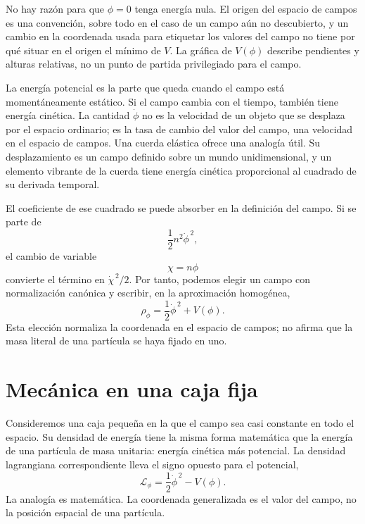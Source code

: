No hay razón para que \(\phi=0\) tenga energía nula. El origen del espacio de campos es una convención, sobre todo en el caso de un campo aún no descubierto, y un cambio en la coordenada usada para etiquetar los valores del campo no tiene por qué situar en el origen el mínimo de \(V\). La gráfica de \(V(\phi)\) describe pendientes y alturas relativas, no un punto de partida privilegiado para el campo.

La energía potencial es la parte que queda cuando el campo está momentáneamente estático. Si el campo cambia con el tiempo, también tiene energía cinética. La cantidad \(\dot\phi\) no es la velocidad de un objeto que se desplaza por el espacio ordinario; es la tasa de cambio del valor del campo, una velocidad en el espacio de campos. Una cuerda elástica ofrece una analogía útil. Su desplazamiento es un campo definido sobre un mundo unidimensional, y un elemento vibrante de la cuerda tiene energía cinética proporcional al cuadrado de su derivada temporal.

El coeficiente de ese cuadrado se puede absorber en la definición del campo. Si se parte de
\begin{equation}
\frac12 n^2\dot\phi^{\,2},
\end{equation}
el cambio de variable
\begin{equation}
\chi=n\phi
\end{equation}
convierte el término en \(\dot\chi^{\,2}/2\). Por tanto, podemos elegir un campo con normalización canónica y escribir, en la aproximación homogénea,
\begin{equation}
\rho_\phi=\frac12\dot\phi^{\,2}+V(\phi).
\label{eq:c09-rho-homogeneous}
\end{equation}
Esta elección normaliza la coordenada en el espacio de campos; no afirma que la masa literal de una partícula se haya fijado en uno.

\section{Mecánica en una caja fija}

Consideremos una caja pequeña en la que el campo sea casi constante en todo el espacio. Su densidad de energía tiene la misma forma matemática que la energía de una partícula de masa unitaria: energía cinética más potencial. La densidad lagrangiana correspondiente lleva el signo opuesto para el potencial,
\begin{equation}
\mathcal L_\phi
=\frac12\dot\phi^{\,2}-V(\phi).
\label{eq:c09-lagrangian-density}
\end{equation}
La analogía es matemática. La coordenada generalizada es el valor del campo, no la posición espacial de una partícula.

